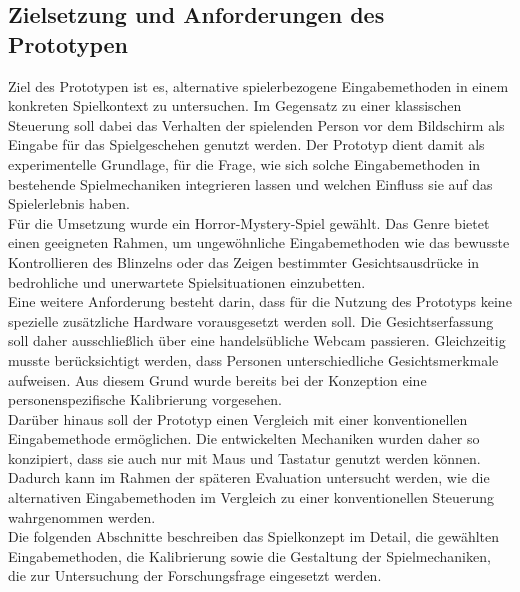 \documentclass[intern]{cgMA}
\begin{document}
\subsection{Zielsetzung und Anforderungen des Prototypen}
Ziel des Prototypen ist es, alternative spielerbezogene Eingabemethoden in einem konkreten Spielkontext zu untersuchen. Im Gegensatz zu einer klassischen Steuerung soll dabei das Verhalten der spielenden Person vor dem Bildschirm als Eingabe für das Spielgeschehen genutzt werden. Der Prototyp dient damit als experimentelle Grundlage, für die Frage, wie sich solche Eingabemethoden in bestehende Spielmechaniken integrieren lassen und welchen Einfluss sie auf das Spielerlebnis haben.\\
Für die Umsetzung wurde ein Horror-Mystery-Spiel gewählt. Das Genre bietet einen geeigneten Rahmen, um ungewöhnliche Eingabemethoden wie das bewusste Kontrollieren des Blinzelns oder das Zeigen bestimmter Gesichtsausdrücke in bedrohliche und unerwartete Spielsituationen einzubetten.\\
Eine weitere Anforderung besteht darin, dass für die Nutzung des Prototyps keine spezielle zusätzliche Hardware vorausgesetzt werden soll. Die Gesichtserfassung soll daher ausschließlich über eine handelsübliche Webcam passieren. Gleichzeitig musste berücksichtigt werden, dass Personen unterschiedliche Gesichtsmerkmale aufweisen. Aus diesem Grund wurde bereits bei der Konzeption eine personenspezifische Kalibrierung vorgesehen.\\
Darüber hinaus soll der Prototyp einen Vergleich mit einer konventionellen Eingabemethode ermöglichen. Die entwickelten Mechaniken wurden daher so konzipiert, dass sie auch nur mit Maus und Tastatur genutzt werden können. Dadurch kann im Rahmen der späteren Evaluation untersucht werden, wie die alternativen Eingabemethoden im Vergleich zu einer konventionellen Steuerung wahrgenommen werden.\\
Die folgenden Abschnitte beschreiben das Spielkonzept im Detail, die gewählten Eingabemethoden, die Kalibrierung sowie die Gestaltung der Spielmechaniken, die zur Untersuchung der Forschungsfrage eingesetzt werden.
\end{document}

